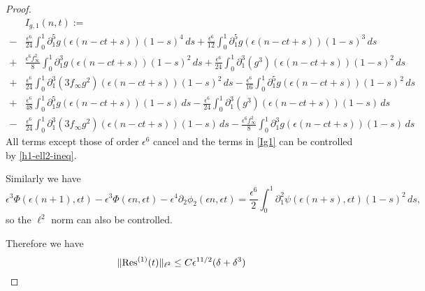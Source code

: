 \begin{proof}
\begin{equation}
\begin{aligned}
		&I_{g,1}(n,t) := \\
		-&\frac{\epsilon^6} {24} \int_0^1 \partial_1^5 g(\epsilon(n - ct + s)) (1-s)^4 \, ds +\frac{\epsilon^6} {12} \int_0^1 \partial_1^5 g(\epsilon(n - ct + s)) (1-s)^3 \, ds \\
		+&\frac{\epsilon^6 f_\infty^2} 8 \int_0^1 \partial_1^3 g(\epsilon(n - ct + s)) (1-s)^2 \, ds +\frac{\epsilon^6} {24} \int_0^1 \partial_1^3(g^3)(\epsilon(n - ct + s)) (1-s)^2 \, ds \\
		+&\frac{\epsilon^6} {24} \int_0^1 \partial_1^3(3f_\infty g^2)(\epsilon(n - ct + s)) (1-s)^2 \, ds - \frac{\epsilon^6} {16} \int_0^1 \partial_1^5g(\epsilon(n - ct + s)) (1-s)^2 \, ds \\
		+ & \frac{\epsilon^6}{48}\int_0^1 \partial_1^5 g(\epsilon(n-ct+s))(1-s)\, ds -  \frac{\epsilon^6}{24} \int_0^1 \partial_1^3(g^3)(\epsilon(n-ct+s))(1-s)\, ds \\
		- & \frac{\epsilon^6}{24} \int_0^1 \partial_1^3(3f_\infty g^2)(\epsilon(n-ct+s))(1-s)\, ds - \frac{\epsilon^6f_\infty ^2}{8} \int_0^1 \partial_1^3 g(\epsilon(n-ct+s)) (1-s) \, ds
	\end{aligned}
	\end{equation}
	All terms except those of order \(\epsilon^6\) cancel and the terms in \cref{Ig1} can be controlled by \cref{h1-ell2-ineq}. 

	
	Similarly we have
	\begin{equation}
		\epsilon^3 \Phi(\epsilon(n+1), \epsilon t) - \epsilon^3\Phi(\epsilon n , \epsilon t) - \epsilon^4 \partial_2 \phi_2(\epsilon n, \epsilon t) =  \frac{\epsilon^6} 2 \int_0^1 \partial_1^2 \psi(\epsilon(n+s),\epsilon t)(1-s)^2\, ds,
	\end{equation}
    so the \(\ell^2\) norm can also be controlled.
	
	Therefore we have 
	\begin{equation}
		\| \mathrm{Res}^{(1)}(t) \|_{\ell^2} \leq C \epsilon^{11/2}(\delta + \delta^3)
	\end{equation}


\end{proof}
